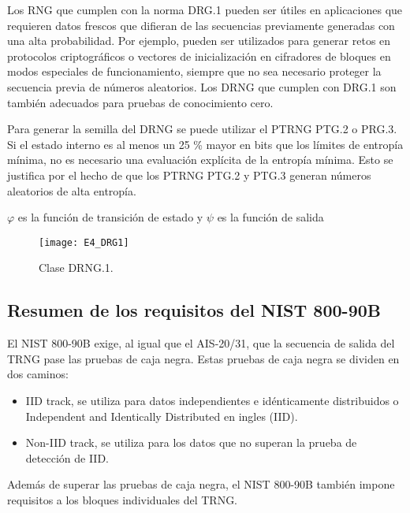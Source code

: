                 Los RNG que cumplen con la norma DRG.1 pueden ser útiles en aplicaciones que requieren datos frescos que difieran de las secuencias previamente generadas con una alta probabilidad. Por ejemplo, pueden ser utilizados para generar retos en protocolos criptográficos o vectores de inicialización en cifradores de bloques en modos especiales de funcionamiento, siempre que no sea necesario proteger la secuencia previa de números aleatorios. Los DRNG que cumplen con DRG.1 son también adecuados para pruebas de conocimiento cero. \cite{AIS2011}

                Para generar la semilla del DRNG se puede utilizar el PTRNG PTG.2 o PRG.3. Si el estado interno es al menos un 25 \% mayor en bits que los límites de entropía mínima, no es necesario una evaluación explícita de la entropía mínima. Esto se justifica por el hecho de que los PTRNG PTG.2 y PTG.3 generan números aleatorios de alta entropía.

                $\varphi$ es la función de transición de estado y $\psi$ es la función de salida

                \begin{figure}[hbtp]
                    \centering
                    \texttt{[image: E4\_DRG1]}
                    \caption{Clase DRNG.1.}
                    \label{fig:E4_DRG1}
                \end{figure}


        \subsection{Resumen de los requisitos del NIST 800-90B}
	
            El NIST 800-90B exige, al igual que el AIS-20/31, que la secuencia de salida del TRNG pase las pruebas de caja negra. Estas pruebas de caja negra se dividen en dos caminos:
            
            \begin{itemize}[noitemsep]
                \item IID track, se utiliza para datos independientes e idénticamente distribuidos o Independent and Identically Distributed en ingles (IID).
                \item Non-IID track, se utiliza para los datos que no superan la prueba de detección de IID.
            \end{itemize}

            Además de superar las pruebas de caja negra, el NIST 800-90B también impone requisitos a los bloques individuales del TRNG.
            
